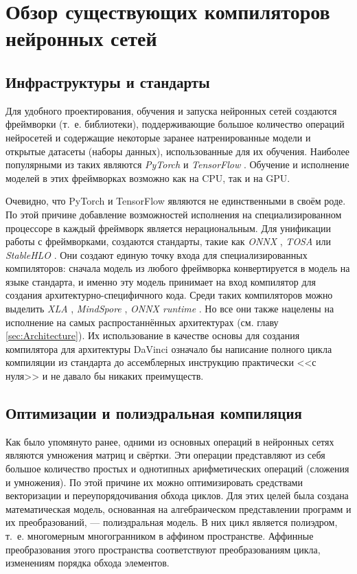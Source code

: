 \section{Обзор существующих компиляторов нейронных сетей}
\label{sec:Compilers} 

\subsection{Инфраструктуры и стандарты}

Для удобного проектирования, обучения и запуска нейронных сетей создаются
фреймворки (т.~е. библиотеки), поддерживающие большое количество операций
нейросетей и содержащие некоторые заранее натренированные модели и открытые
датасеты (наборы данных), использованные для их обучения. Наиболее популярными
из таких являются \textit{PyTorch} \cite{pytorch} и \textit{TensorFlow}
\cite{tensorflow}. Обучение и исполнение
моделей в этих фреймворках возможно как на CPU, так и на GPU.

Очевидно, что PyTorch и TensorFlow являются не единственными в своём роде.
По этой причине добавление возможностей исполнения на специализированном
процессоре в каждый фреймворк является нерациональным. Для унификации работы
с фреймворками, создаются стандарты, такие как \textit{ONNX} \cite{onnx},
\textit{TOSA} \cite{tosa} или \textit{StableHLO} \cite{stablehlo}.
Они создают единую точку входа для специализированных
компиляторов: сначала модель из любого фреймворка конвертируется в модель на
языке стандарта, и именно эту модель принимает на вход компилятор для создания
архитектурно-специфичного кода. Среди таких компиляторов можно выделить
\textit{XLA} \cite{xla}, \textit{MindSpore} \cite{mindspore},
\textit{ONNX runtime} \cite{onnx-runtime}. Но все они также
нацелены на исполнение на самых распростаннённых архитектурах (см. главу \ref{sec:Architecture}).
Их использование в качестве основы для создания
компилятора для архитектуры DaVinci означало бы написание полного цикла
компиляции из стандарта до ассемблерных инструкцию практически <<с нуля>> и
не давало бы никаких преимуществ. 

\subsection{Оптимизации и полиэдральная компиляция}
\label{subsec:poly}

Как было упомянуто ранее, одними из основных операций в нейронных сетях
являются умножения матриц и свёртки. Эти операции представляют из себя большое
количество простых и однотипных арифметических операций (сложения и умножения).
По этой причине их можно оптимизировать средствами векторизации и
переупорядочивания обхода циклов. Для этих целей была создана математическая
модель, основанная на алгебраическом представлении программ и их
преобразований, --- полиэдральная модель. В них цикл является полиэдром,
т.~е. многомерным многогранником в аффином пространстве. Аффинные преобразования
этого пространства соответствуют преобразованиям цикла, изменениям порядка
обхода элементов.

